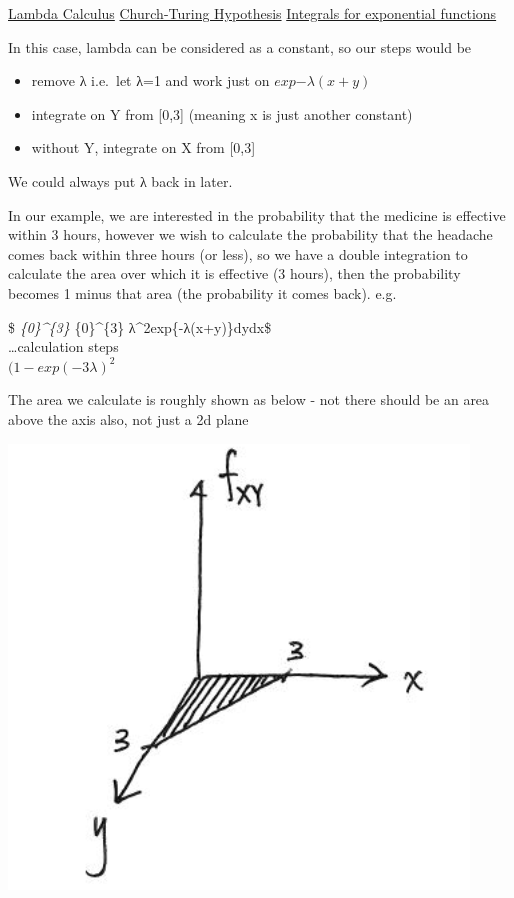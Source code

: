 \documentclass[]{book}
\providecommand{\tightlist}{%
  \setlength{\itemsep}{0pt}\setlength{\parskip}{0pt}}
\theoremstyle{definition}
\theoremstyle{definition}
\theoremstyle{definition}
\theoremstyle{remark}
\begin{document}
\href{https://www.youtube.com/watch?v=eis11j_iGMs}{Lambda Calculus}
\href{https://en.wikipedia.org/wiki/Church\%E2\%80\%93Turing_thesis}{Church-Turing
Hypothesis}
\href{https://en.wikipedia.org/wiki/List_of_integrals_of_exponential_functions\#Integrals_involving_only_exponential_functions}{Integrals
for exponential functions}

In this case, lambda can be considered as a constant, so our steps would
be

\begin{itemize}
\tightlist
\item
  remove λ i.e.~let λ=1 and work just on \(exp{-λ(x+y)}\)\\
\item
  integrate on Y from {[}0,3{]} (meaning x is just another constant)\\
\item
  without Y, integrate on X from {[}0,3{]}
\end{itemize}

We could always put λ back in later.

In our example, we are interested in the probability that the medicine
is effective within 3 hours, however we wish to calculate the
probability that the headache comes back within three hours (or less),
so we have a double integration to calculate the area over which it is
effective (3 hours), then the probability becomes 1 minus that area (the
probability it comes back). e.g.

\$ \int\emph{\{0\}\^{}\{3\} \int}\{0\}\^{}\{3\}
λ\^{}2exp\{-λ(x+y)\}dydx\$\\
\ldots{}calculation steps\\
\((1-exp({-3λ})^2\)

The area we calculate is roughly shown as below - not there should be an
area above the axis also, not just a 2d plane

\includegraphics[width=1\linewidth]{images/headache}
\end{document}
